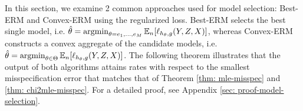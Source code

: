 In this section, we examine 2 common approaches used for model selection: Best-ERM and Convex-ERM using the regularized loss. Best-ERM selects the best single model, i.e. $\hat{\theta} = \mathop{\mathrm{argmin}}_{\theta = e_1, \dots, e_M}  \mathbb{E}_n[\ell_{h_\theta,g}(Y,Z,X)] $, whereas Convex-ERM constructs a convex aggregate of the candidate models, i.e. $\hat{\theta} = \mathop{\mathrm{argmin}}_{\theta \in \Theta}  \mathbb{E}_n[\ell_{h_\theta,g}(Y,Z,X)]$. The following theorem illustrates that the output of both algorithms attains rates with respect to the smallest misspecification error that matches that of Theorem \ref{thm: mle-misspec} and \ref{thm: chi2mle-misspec}. For a detailed proof, see Appendix \ref{sec: proof-model-selection}.
\fi 
